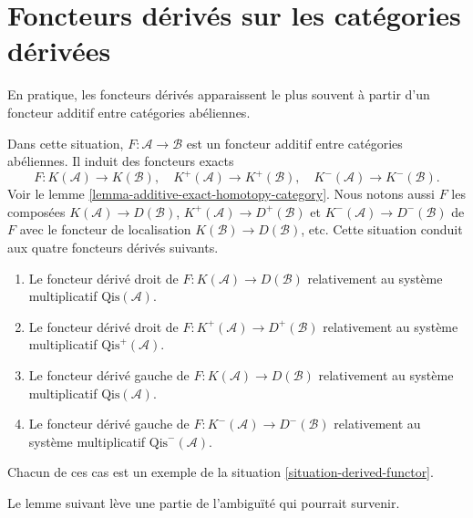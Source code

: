 \section{Foncteurs dérivés sur les catégories dérivées}
\label{section-derived-functors-classical}

\noindent
En pratique, les foncteurs dérivés apparaissent le plus souvent à partir d'un
foncteur additif entre catégories abéliennes.

\begin{situation}
\label{situation-classical}
Dans cette situation, $F : \mathcal{A} \to \mathcal{B}$ est un foncteur
additif entre catégories abéliennes. Il induit des foncteurs exacts
$$
F : K(\mathcal{A}) \to K(\mathcal{B}), \quad
K^{+}(\mathcal{A}) \to K^{+}(\mathcal{B}), \quad
K^{-}(\mathcal{A}) \to K^{-}(\mathcal{B}).
$$
Voir le lemme \ref{lemma-additive-exact-homotopy-category}. Nous notons aussi
$F$ les composées $K(\mathcal{A}) \to D(\mathcal{B})$,
$K^{+}(\mathcal{A}) \to D^{+}(\mathcal{B})$ et
$K^{-}(\mathcal{A}) \to D^-(\mathcal{B})$ de $F$ avec le foncteur de
localisation $K(\mathcal{B}) \to D(\mathcal{B})$, etc. Cette situation conduit
aux quatre foncteurs dérivés suivants.
\begin{enumerate}
\item Le foncteur dérivé droit de
$F : K(\mathcal{A}) \to D(\mathcal{B})$ relativement au système multiplicatif
$\text{Qis}(\mathcal{A})$.
\item Le foncteur dérivé droit de
$F : K^{+}(\mathcal{A}) \to D^{+}(\mathcal{B})$ relativement au système
multiplicatif $\text{Qis}^{+}(\mathcal{A})$.
\item Le foncteur dérivé gauche de
$F : K(\mathcal{A}) \to D(\mathcal{B})$ relativement au système multiplicatif
$\text{Qis}(\mathcal{A})$.
\item Le foncteur dérivé gauche de
$F : K^{-}(\mathcal{A}) \to D^{-}(\mathcal{B})$ relativement au système
multiplicatif $\text{Qis}^-(\mathcal{A})$.
\end{enumerate}
Chacun de ces cas est un exemple de la
situation \ref{situation-derived-functor}.
\end{situation}

\noindent
Le lemme suivant lève une partie de l'ambiguïté qui pourrait survenir.

